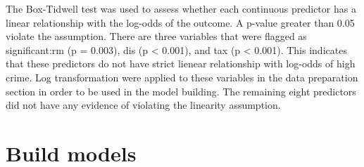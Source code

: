 \documentclass[
  11pt]{article}
\newenvironment{Shaded}{\begin{snugshade}}{\end{snugshade}}
\newcommand{\AttributeTok}[1]{\textcolor[rgb]{0.40,0.45,0.13}{#1}}
\newcommand{\CommentTok}[1]{\textcolor[rgb]{0.37,0.37,0.37}{#1}}
\newcommand{\DecValTok}[1]{\textcolor[rgb]{0.68,0.00,0.00}{#1}}
\newcommand{\FloatTok}[1]{\textcolor[rgb]{0.68,0.00,0.00}{#1}}
\newcommand{\FunctionTok}[1]{\textcolor[rgb]{0.28,0.35,0.67}{#1}}
\newcommand{\NormalTok}[1]{\textcolor[rgb]{0.00,0.23,0.31}{#1}}
\newcommand{\OtherTok}[1]{\textcolor[rgb]{0.00,0.23,0.31}{#1}}
\newcommand{\SpecialCharTok}[1]{\textcolor[rgb]{0.37,0.37,0.37}{#1}}
\newcommand{\StringTok}[1]{\textcolor[rgb]{0.13,0.47,0.30}{#1}}
\begin{document}
\begin{Shaded}
\end{Shaded}

The Box-Tidwell test was used to assess whether each continuous
predictor has a linear relationship with the log-odds of the outcome. A
p-value greater than 0.05 violate the assumption. There are three
variables that were flagged as significant:rm (p = 0.003), dis (p
\textless{} 0.001), and tax (p \textless{} 0.001). This indicates that
these predictors do not have strict lienear relationship with log-odds
of high crime. Log transformation were applied to these variables in the
data preparation section in order to be used in the model building. The
remaining eight predictors did not have any evidence of violating the
linearity assumption.

\section{Build models}\label{build-models}
\end{document}
